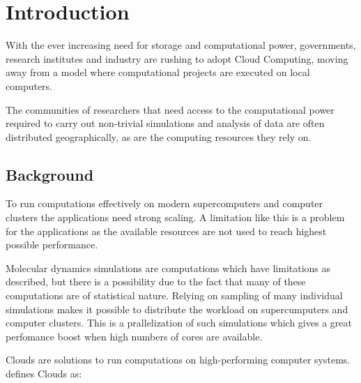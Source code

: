 \chapter{Introduction}
With the ever increasing need for storage and computational power,
governments, research institutes and industry are rushing to adopt
Cloud Computing, moving away from a model where computational projects
are executed on local computers.

The communities of researchers that need access to the computational
power required to carry out non-trivial simulations and analysis of
data are often distributed geographically, as are the computing
resources they rely on.



\section{Background}
To run computations effectively on modern supercomputers and computer
clusters the applications need strong scaling. A limitation like this
is a problem for the applications as the available resources are not
used to reach highest possible performance.




Molecular dynamics simulations are computations which have limitations
as described, but there is a possibility due to the fact that many of
these computations are of statistical nature. Relying on sampling of
many individual simulations makes it possible to distribute the
workload on supercumputers and computer clusters. This is a
prallelization of such simulations which gives a great perfomance
boost when high numbers of cores are available.



Clouds are solutions to run computations on high-performing computer
systems. \cite{foster:2008} defines Clouds as:

